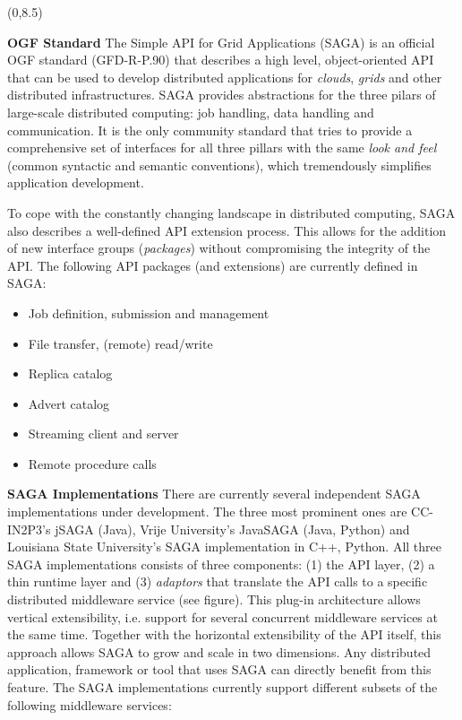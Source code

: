 \documentclass[a0b,portrait]{a0poster}
\def\LHead#1{\bigskip\bigskip\noindent{\huge\color{HeadColor} #1}\smallskip}
\begin{document}
\begin{textblock}{7}(0,8.5)

\LHead{What is SAGA ?}
\large

\textbf{\color{DarkBlue} OGF Standard } The Simple API for Grid Applications
(SAGA) is an official OGF standard (GFD-R-P.90) that describes a high level,
object-oriented API that can be used to develop distributed applications for
\textit{clouds}, \textit{grids} and other distributed infrastructures.  SAGA
provides abstractions for the three pilars of large-scale distributed
computing: job handling, data handling and communication. It is the only
community standard that tries to provide a comprehensive set of interfaces for
all three pillars with the same \textit{look and feel} (common syntactic and
semantic conventions), which tremendously simplifies application development.

To cope with the constantly changing landscape in distributed computing, SAGA
also describes a well-defined API extension process. This allows for the
addition of new interface groups (\textit{packages}) without compromising the
integrity of the API. The following API packages (and extensions) are
currently defined in SAGA:

\begin{itemize} 
\item{Job definition, submission and management }
\item{File transfer, (remote) read/write } 
\item{Replica catalog }
\item{Advert catalog } 
\item{Streaming client and server } 
\item{Remote procedure calls } 
\end{itemize}

\textbf{\color{DarkBlue} SAGA Implementations } There are currently several
independent SAGA implementations under development. The three most prominent
ones are CC-IN2P3's jSAGA (Java), Vrije University's JavaSAGA (Java, Python)
and Louisiana State University's SAGA implementation in C++, Python. All three
SAGA implementations consists of three components: (1) the API layer, (2) a
thin runtime layer and (3) \textit{adaptors} that translate the API calls to a
specific distributed middleware service (see figure). This plug-in
architecture allows vertical extensibility, i.e. support for several
concurrent middleware services at the same time. Together with the horizontal
extensibility of the API itself, this approach allows SAGA to grow and scale
in two dimensions. Any distributed application, framework or tool that uses
SAGA can directly benefit from this feature. The SAGA implementations 
currently support different subsets of the following middleware services:


\end{textblock}
\end{document}
